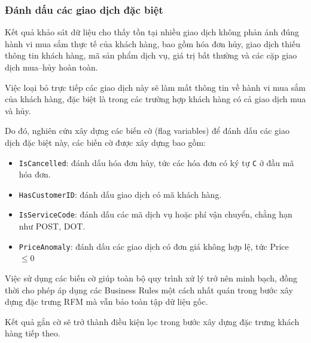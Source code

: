 \documentclass[12pt]{ai_conquer2026}
\begin{document}
\subsubsection{Đánh dấu các giao dịch đặc biệt}

Kết quả khảo sát dữ liệu cho thấy tồn tại nhiều giao dịch không phản ánh đúng hành vi mua sắm thực tế của khách hàng, bao gồm hóa đơn hủy, giao dịch thiếu thông tin khách hàng, mã sản phẩm dịch vụ, giá trị bất thường và các cặp giao dịch mua--hủy hoàn toàn.

Việc loại bỏ trực tiếp các giao dịch này sẽ làm mất thông tin về hành vi mua sắm của khách hàng, đặc biệt là trong các trường hợp khách hàng có cả giao dịch mua và hủy. 

Do đó, nghiên cứu xây dựng các biến cờ (flag variables) để đánh dấu các giao dịch đặc biệt này, các biến cờ được xây dựng bao gồm:

\begin{itemize}
\item \texttt{IsCancelled}: đánh dấu hóa đơn hủy, tức các hóa đơn có ký tự \texttt{C} ở đầu mã hóa đơn.
\item \texttt{HasCustomerID}: đánh dấu giao dịch có mã khách hàng.
\item \texttt{IsServiceCode}: đánh dấu các mã dịch vụ hoặc phí vận chuyển, chằng hạn như POST, DOT.
\item \texttt{PriceAnomaly}: đánh dấu các giao dịch có đơn giá không hợp lệ, tức Price $\leq 0$
\end{itemize}

Việc sử dụng các biến cờ giúp toàn bộ quy trình xử lý trở nên minh bạch, đồng thời cho phép áp dụng các Business Rules một cách nhất quán trong bước xây dựng đặc trưng RFM mà vẫn bảo toàn tập dữ liệu gốc.

Kết quả gắn cờ sẽ trở thành điều kiện lọc trong bước xây dựng đặc trưng khách hàng tiếp theo.

\begin{table}[H]
\centering
\caption{Các bản ghi được đánh dấu trong giai đoạn tiền xử lý}
\label{tab:preprocessing_flags}


\end{table}
\end{document}
